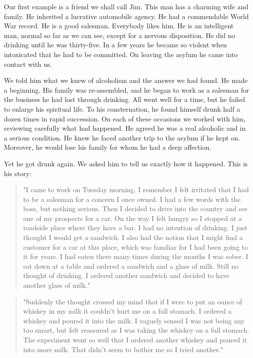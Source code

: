 \begin{biblechapter}

Our first example is a friend we shall call Jim. 
This man has a charming wife and family. 
He inherited a lucrative automobile agency. 
He had a commendable World War record. 
He is a good salesman. 
Everybody likes him. 
He is an intelligent man, normal so far as we can see, 
except for a nervous disposition. 
He did no drinking until he was thirty-five. 
In a few years he became so violent when intoxicated that he had to be committed. 
On leaving the asylum he came into contact with us.

We told him what we knew of alcoholism and the answer we had found. 
He made a beginning. 
His family was re-assembled, 
and he began to work as a salesman for the business he had lost through drinking. 
All went well for a time, but he failed to enlarge his spiritual life. 
To his consternation, he found himself drunk half a dozen times in rapid succession. 
On each of these occasions we worked with him, reviewing carefully what had happened. 
He agreed he was a real alcoholic and in a serious condition. 
He knew he faced another trip to the asylum if he kept on. 
Moreover, he would lose his family for whom he had a deep affection.

Yet he got drunk again. 
We asked him to tell us exactly how it happened. 
This is his story: 
\begin{quote}
"I came to work on Tuesday morning. 
I remember I felt irritated that I had to be a salesman for a concern I once owned. 
I had a few words with the boss, but nothing serious. 
Then I decided to drive into the country and see one of my prospects for a car. 
On the way I felt hungry so I stopped at a roadside place where they have a bar. 
I had no intention of drinking. 
I just thought I would get a sandwich. 
I also had the notion that I might find a customer for a car at this place, 
which was familiar for I had been going to it for years. 
I had eaten there many times during the months I was sober. 
I sat down at a table and ordered a sandwich and a glass of milk. 
Still no thought of drinking. 
I ordered another sandwich and decided to have another glass of milk."
\end{quote}

\begin{quote}
"Suddenly the thought crossed my mind 
that if I were to put an ounce of whiskey in my milk 
it couldn't hurt me on a full stomach. 
I ordered a whiskey and poured it into the milk. 
I vaguely sensed I was not being any too smart, 
but felt reassured as I was taking the whiskey on a full stomach. 
The experiment went so well that I ordered another whiskey 
and poured it into more milk. 
That didn't seem to bother me so I tried another."
\end{quote}


\end{biblechapter}

